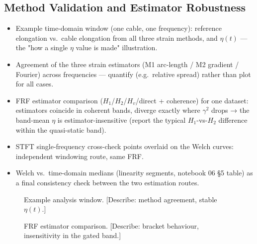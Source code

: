 \subsection{Method Validation and Estimator Robustness}
\label{sec:res:validation}

\begin{itemize}
  \item Example time-domain window (one cable, one frequency): reference
    elongation vs.\ cable elongation from all three strain methods, and
    $\eta(t)$ — the "how a single $\eta$ value is made" illustration.
  \item Agreement of the three strain estimators (M1 arc-length / M2 gradient /
    Fourier) across frequencies — quantify (e.g.\ relative spread) rather
    than plot for all cases.
  \item FRF estimator comparison ($H_1$/$H_2$/$H_v$/direct + coherence) for
    one dataset: estimators coincide in coherent bands, diverge exactly where
    $\gamma^2$ drops → the band-mean $\eta$ is estimator-insensitive
    (report the typical $H_1$-vs-$H_2$ difference within the quasi-static
    band).
  \item STFT single-frequency cross-check points overlaid on the Welch
    curves: independent windowing route, same FRF.
  \item Welch vs.\ time-domain medians (linearity segments, notebook 06 §5
    table) as a final consistency check between the two estimation routes.
\end{itemize}

\begin{figure}[htb]
  \centering
  \caption{Example analysis window. [Describe: method agreement, stable
    $\eta(t)$.]}
  \label{fig:res:window}
\end{figure}

\begin{figure}[htb]
  \centering
  \caption{FRF estimator comparison. [Describe: bracket behaviour,
    insensitivity in the gated band.]}
  \label{fig:res:estimators}
\end{figure}

